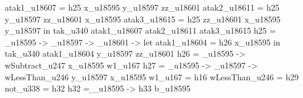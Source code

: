                                                                                                                                                                                                 atak1_u18607 = h25 x_u18595 y_u18597 zz_u18601
                                                                                                                                                                                                atak2_u18611 = h25 y_u18597 zz_u18601 x_u18595
                                                                                                                                                                                                atak3_u18615 = h25 zz_u18601 x_u18595 y_u18597
                                                                                                                                                                                              in tak_u340 atak1_u18607 atak2_u18611 atak3_u18615
                                                                                                                                                h25 = \x_u18595 -> \y_u18597 -> \zz_u18601 -> let
                                                                                                                                                                                                atak1_u18604 = h26 x_u18595
                                                                                                                                                                                              in tak_u340 atak1_u18604 y_u18597 zz_u18601
                                                                                                                                                h26 = \x_u18595 -> wSubtract_u247 x_u18595 w1_u167
                                                                                                                                                h27 = \x_u18595 -> \y_u18597 -> wLessThan_u246 y_u18597 x_u18595
                                                                                                                                                w1_u167 = h16
                                                                                                                                                wLessThan_u246 = h29
                                                                                                                                                not_u338 = h32
                                                                                                                                                h32 = \b_u18595 -> h33 b_u18595
